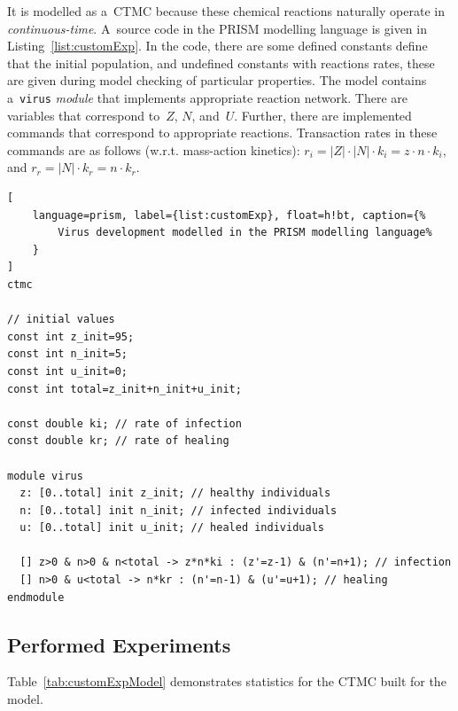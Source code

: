 \documentclass[a4paper, 11pt]{article}
\theoremstyle{definition}
\begin{document}
It is modelled as a~CTMC because these chemical reactions naturally
operate in \emph{continuous-time}. A~source code in the PRISM modelling
language is given in Listing~\ref{list:customExp}. In the code, there are
some defined constants define that the initial population, and undefined
constants with reactions rates, these are given during model checking
of particular properties. The model contains a~\texttt{virus}
\emph{module} that implements appropriate reaction network. There are
variables that correspond to~$ Z $, $ N $, and~$ U $. Further, there
are implemented commands that correspond to appropriate reactions.
Transaction rates in these commands are as follows (w.r.t. mass-action
kinetics): $ r_i = |Z| \cdot |N| \cdot k_i = z \cdot n \cdot k_i $,
and $ r_r = |N| \cdot k_r = n \cdot k_r $.

\begin{lstlisting}[
    language=prism, label={list:customExp}, float=h!bt, caption={%
        Virus development modelled in the PRISM modelling language%
    }
]
ctmc

// initial values
const int z_init=95;
const int n_init=5;
const int u_init=0;
const int total=z_init+n_init+u_init;

const double ki; // rate of infection
const double kr; // rate of healing

module virus
  z: [0..total] init z_init; // healthy individuals
  n: [0..total] init n_init; // infected individuals
  u: [0..total] init u_init; // healed individuals

  [] z>0 & n>0 & n<total -> z*n*ki : (z'=z-1) & (n'=n+1); // infection
  [] n>0 & u<total -> n*kr : (n'=n-1) & (u'=u+1); // healing
endmodule
\end{lstlisting}

\subsection{Performed Experiments}
\label{sec:customExpExps}

Table~\ref{tab:customExpModel} demonstrates statistics for the CTMC built
for the model.
\end{document}
